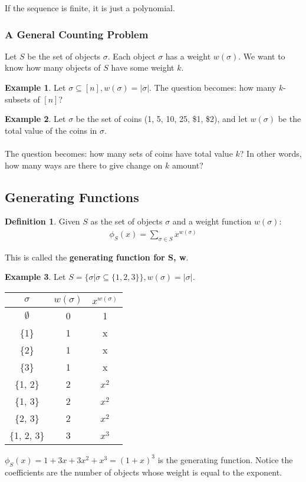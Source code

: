 \documentclass[]{article}
\theoremstyle{definition}
\newtheorem*{defn}{Definition}
\newtheorem{ex}{Example}[section]
\begin{document}
			If the sequence is finite, it is just a polynomial.
			
			\subsubsection{A General Counting Problem}
				Let $S$ be the set of objects $\sigma$. Each object $\sigma$ has a weight $w(\sigma)$. We want to know how many objects of $S$ have some weight $k$.
				
				\begin{ex}
					Let $\sigma \subseteq [n], w(\sigma) = |\sigma|$. The question becomes: how many $k$-subsets of $[n]$?
				\end{ex}
				
				\begin{ex}
					Let $\sigma$ be the set of coins (1\cent, 5\cent, 10\cent, 25\cent, \$1, \$2), and let $w(\sigma)$ be the total value of the coins in $\sigma$.
					\\ \\
					The question becomes: how many sets of coins have total value $k$? In other words, how many ways are there to give change on $k$ amount?
				\end{ex}
		\subsection{Generating Functions}
			\begin{defn}
				Given $S$ as the set of objects $\sigma$ and a weight function $w(\sigma)$:
				\begin{align*}
					\phi_S(x) = \sum_{\sigma \in S} x^{w(\sigma)}
				\end{align*}
				
				This is called the \textbf{generating function for S, w}.
			\end{defn}
			
			\begin{ex}
				Let $S = \{ \sigma | \sigma \subseteq \{1, 2, 3\} \}, w(\sigma) = |\sigma|$.
				
				\begin{center}
					\begin{tabular}{c|c|c}
						$\sigma$ & $w(\sigma)$ & $x^{w(\sigma)}$ \\ \hline
						$\emptyset$ & 0 & 1 \\
						\{1\} & 1 & x \\
						\{2\} & 1 & x \\
						\{3\} & 1 & x \\
						\{1, 2\} & 2 & $x^2$ \\
						\{1, 3\} & 2 & $x^2$ \\
						\{2, 3\} & 2 & $x^2$ \\
						\{1, 2, 3\} & 3 & $x^3$ \\
					\end{tabular}
				\end{center}
				
				$\phi_S(x) = 1 + 3x + 3x^2 + x^3 = (1 + x)^3$ is the generating function. Notice the coefficients are the number of objects whose weight is equal to the exponent.
			\end{ex}
			
\end{document}
